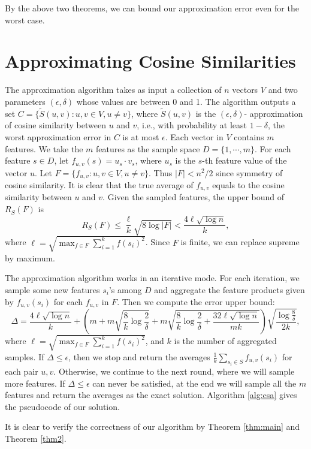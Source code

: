 \documentclass{article}
\begin{document}
By the above two theorems, we can bound our approximation error even for the worst case.


\section{Approximating Cosine Similarities}
The approximation algorithm takes as input a collection of $n$ vectors $V$ and two parameters $(\epsilon, \delta)$ whose values are between 0 and 1. The algorithm outputs a set $C = \{\tilde{S}(u,v): u,v \in V, u\not= v\}$, where $\tilde{S}(u,v)$ is the $(\epsilon, \delta)$- approximation of cosine similarity between $u$ and $v$, i.e., with probability at least $1-\delta$, the worst approximation error in $C$ is at most $\epsilon$. Each vector in $V$ contains $m$ features. We take the $m$ features as the sample space $D = \{1,\cdots,m\}$. For each feature $s\in D$, let $f_{u,v}(s) = u_s\cdot v_s$, where $u_s$ is the $s$-th feature value of the vector $u$. Let $F = \{f_{u,v}: u,v\in V, u\not= v\}$. Thus $|F| < n^2/2$ since symmetry of cosine similarity. It is clear that the true average of $f_{u,v}$ equals to the cosine similarity between $u$ and $v$. Given the sampled features, the upper bound of $R_S(F)$ is 
$$R_S(F) \leq \frac{\ell}{k}\sqrt{8\log |F|} < \frac{4\ell\sqrt{\log n}}{k},$$
where $\ell = \sqrt{\max_{f\in F} \sum_{i=1}^k f(s_i)^2}$. Since $F$ is finite, we can replace supreme by maximum. 

The approximation algorithm works in an iterative mode. For each iteration, we sample some new features $s_i$'s among $D$ and aggregate the feature products given by $f_{u,v}(s_i)$ for each $f_{u,v}$ in $F$. Then we compute the error upper bound:
$$\Delta = \frac{4\ell\sqrt{\log n}}{k} +\left(m+m\sqrt{\frac{8}{k}\log \frac{2}{\delta}} + m\sqrt{\frac{8}{k}\log \frac{2}{\delta} + \frac{32\ell\sqrt{\log n}}{mk}}\right)\sqrt{\frac{\log \frac{8}{\delta}}{2k}},$$
where $\ell = \sqrt{\max_{f\in F} \sum_{i=1}^k f(s_i)^2}$, and $k$ is the number of aggregated samples. 
If $\Delta \leq \epsilon$, then we stop and return the averages $\frac{1}{k}\sum_{s_i\in S}f_{u,v}(s_i)$ for each pair $u, v$. Otherwise, we continue to the next round, where we will sample more features. If $\Delta \leq \epsilon$ can never be satisfied, at the end we will sample all the $m$ features and return the averages as the exact solution. Algorithm \ref{alg:csa} gives the pseudocode of our solution.

It is clear to verify the correctness of our algorithm by Theorem \ref{thm:main} and Theorem \ref{thm2}.
\end{document}
